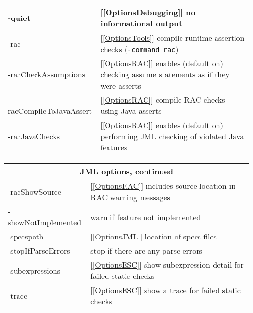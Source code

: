 \documentclass{report}%
\begin{document}
\begin{table}
{\begin{tabular}{|l|p{1.4in}|}
-quiet & [\ref{OptionsDebugging}] no informational output \\ \hline
-rac & [\ref{OptionsTools}] compile runtime assertion checks ({\tt -command rac})\\ \hline
-racCheckAssumptions & [\ref{OptionsRAC}] enables (default on) checking assume statements as if they were asserts \\ \hline
-racCompileToJavaAssert & [\ref{OptionsRAC}] compile RAC checks using Java asserts \\ \hline
-racJavaChecks & [\ref{OptionsRAC}] enables (default on) performing JML checking of violated Java features \\ \hline
\end{tabular}
}
\qquad
\parbox{.5\textwidth}{

\begin{tabular}{|l|p{1.4in}|}
\hline
\multicolumn{2}{|c|}{JML options, continued} \\
\hline
-racShowSource & [\ref{OptionsRAC}] includes source location in RAC warning messages \\ \hline
-showNotImplemented & warn if feature not implemented\\ \hline
-specspath & [\ref{OptionsJML}] location of specs files\\ \hline
-stopIfParseErrors & stop if there are any parse errors \\ \hline
-subexpressions & [\ref{OptionsESC}] show subexpression detail for failed static checks\\ \hline
-trace & [\ref{OptionsESC}] show a trace for failed static checks\\ \hline

\end{tabular}

\vspace*{.5in}

}
\end{table}
\end{document}
